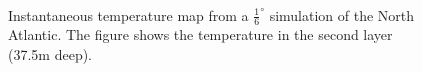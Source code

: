 \begin{figure}
\\
  \caption{Instantaneous temperature map from a $\frac{1}{6}^{\circ }$
    simulation of the North Atlantic. The figure shows the temperature
    in the second layer (37.5m deep).}
\label{fig:ocean-gyres}
\end{figure}
